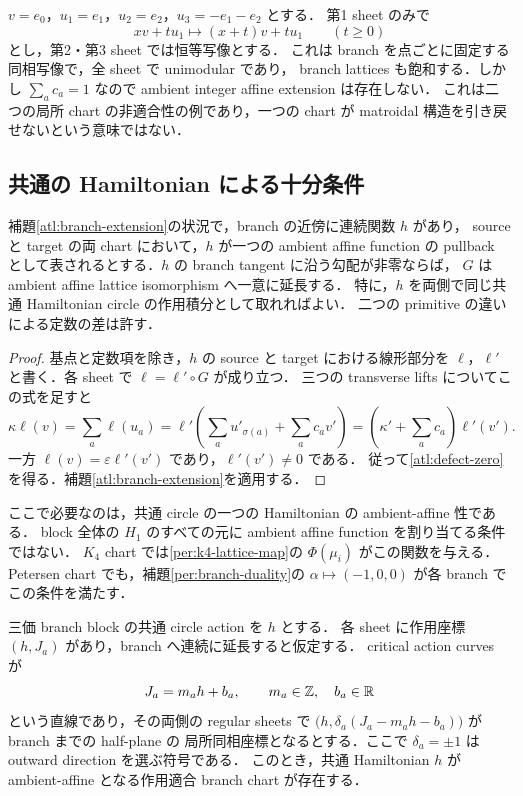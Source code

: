 \begin{example}
\label{atl:counterexample}
$v=e_0$，$u_1=e_1$，$u_2=e_2$，$u_3=-e_1-e_2$ とする．
第1 sheet のみで
\[
 xv+tu_1\longmapsto(x+t)v+tu_1\qquad(t\geq0)
\]
とし，第2・第3 sheet では恒等写像とする．
これは branch を点ごとに固定する同相写像で，全 sheet で unimodular であり，
branch lattices も飽和する．しかし $\sum_a c_a=1$ なので
ambient integer affine extension は存在しない．
これは二つの局所 chart の非適合性の例であり，一つの chart が
matroidal 構造を引き戻せないという意味ではない．
\end{example}

\subsection{共通の Hamiltonian による十分条件}

\begin{proposition}
\label{atl:common-hamiltonian}
補題\ref{atl:branch-extension}の状況で，branch の近傍に連続関数 $h$ があり，
source と target の両 chart において，$h$ が一つの ambient affine function の
pullback として表されるとする．$h$ の branch tangent に沿う勾配が非零ならば，
$G$ は ambient affine lattice isomorphism へ一意に延長する．
特に，$h$ を両側で同じ共通 Hamiltonian circle の作用積分として取れればよい．
二つの primitive の違いによる定数の差は許す．
\end{proposition}

\begin{proof}
基点と定数項を除き，$h$ の source と target における線形部分を
$\ell$，$\ell'$ と書く．各 sheet で $\ell=\ell'\circ G$ が成り立つ．
三つの transverse lifts についてこの式を足すと
\[
 \kappa\ell(v)
 =\sum_a\ell(u_a)
 =\ell'\left(\sum_a u'_{\sigma(a)}+\sum_a c_a v'\right)
 =(\kappa'+\sum_a c_a)\ell'(v').
\]
一方 $\ell(v)=\varepsilon\ell'(v')$ であり，$\ell'(v')\ne0$ である．
従って\eqref{atl:defect-zero}を得る．補題\ref{atl:branch-extension}を適用する．
\end{proof}

ここで必要なのは，共通 circle の一つの Hamiltonian の ambient-affine 性である．
block 全体の $H_1$ のすべての元に ambient affine function を割り当てる条件ではない．
$K_4$ chart では\eqref{per:k4-lattice-map}の $\Phi(\mu_i)$ がこの関数を与える．
Petersen chart でも，補題\ref{per:branch-duality}の
$\alpha\mapsto(-1,0,0)$ が各 branch でこの条件を満たす．

\begin{lemma}
\label{atl:qone-chart}
三価 branch block の共通 circle action を $h$ とする．
各 sheet に作用座標 $(h,J_a)$ があり，branch へ連続に延長すると仮定する．
critical action curves が
\[
 J_a=m_a h+b_a,\qquad m_a\in\mathbb Z,\quad b_a\in\mathbb R
\]
という直線であり，その両側の regular sheets で
$\bigl(h,\delta_a(J_a-m_a h-b_a)\bigr)$ が branch までの half-plane の
局所同相座標となるとする．ここで $\delta_a=\pm1$ は outward direction を選ぶ符号である．
このとき，共通 Hamiltonian $h$ が ambient-affine となる作用適合 branch chart が存在する．
\end{lemma}


